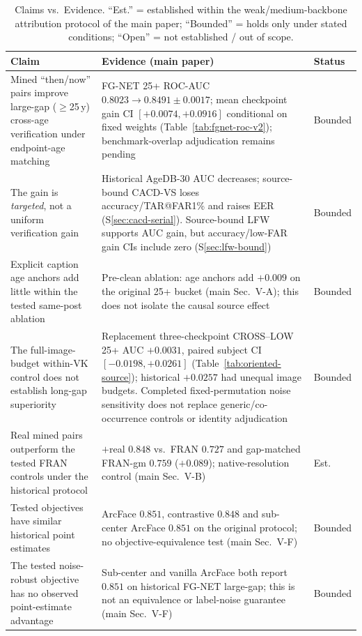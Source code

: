 \documentclass[journal]{IEEEtran}
\newcommand{\mainsec}[1]{main Sec.~#1}
\begin{document}
\begin{table}[!t]
\renewcommand{\arraystretch}{1.15}
\caption{Claims vs.\ Evidence. ``Est.'' = established within the weak/medium-backbone attribution
protocol of the main paper; ``Bounded'' = holds only under stated conditions; ``Open'' = not
established / out of scope.}
\label{tab:claims}
\centering
\footnotesize
\begin{tabular}{@{}p{}p{}p{}@{}}
\toprule
Claim & Evidence (main paper) & Status \\
\midrule
Mined ``then/now'' pairs improve large-gap ($\geq$25\,y) cross-age verification under endpoint-age matching &
FG-NET 25+ ROC-AUC $0.8023\!\to\!0.8491{\pm}0.0017$; mean checkpoint gain CI $[+0.0074,+0.0916]$ conditional on fixed weights (Table~\ref{tab:fgnet-roc-v2}); benchmark-overlap adjudication remains pending & Bounded \\
The gain is \emph{targeted}, not a uniform verification gain &
Historical AgeDB-30 AUC decreases; source-bound CACD-VS loses accuracy/TAR@FAR1\% and raises EER (S\ref{sec:cacd-serial}). Source-bound LFW supports AUC gain, but accuracy/low-FAR gain CIs include zero (S\ref{sec:lfw-bound}) & Bounded \\
Explicit caption age anchors add little within the tested same-post ablation &
Pre-clean ablation: age anchors add $+0.009$ on the original 25+ bucket (\mainsec{V-A}); this does not isolate the causal source effect & Bounded \\
The full-image-budget within-VK control does not establish long-gap superiority &
Replacement three-checkpoint CROSS--LOW 25+ AUC $+0.0031$, paired subject CI $[-0.0198,+0.0261]$ (Table~\ref{tab:oriented-source}); historical $+0.0257$ had unequal image budgets. Completed fixed-permutation noise sensitivity does not replace generic/co-occurrence controls or identity adjudication & Bounded \\
Real mined pairs outperform the tested FRAN controls under the historical protocol &
$+$real $0.848$ vs.\ FRAN $0.727$ and gap-matched FRAN-gm $0.759$ ($+0.089$); native-resolution control (\mainsec{V-B}) & Est. \\
Tested objectives have similar historical point estimates &
ArcFace $0.851$, contrastive $0.848$ and sub-center ArcFace $0.851$ on the original protocol; no objective-equivalence test (\mainsec{V-F}) & Bounded \\
The tested noise-robust objective has no observed point-estimate advantage &
Sub-center and vanilla ArcFace both report $0.851$ on historical FG-NET large-gap; this is not an equivalence or label-noise guarantee (\mainsec{V-F}) & Bounded \\

\end{tabular}
\end{table}
\end{document}
